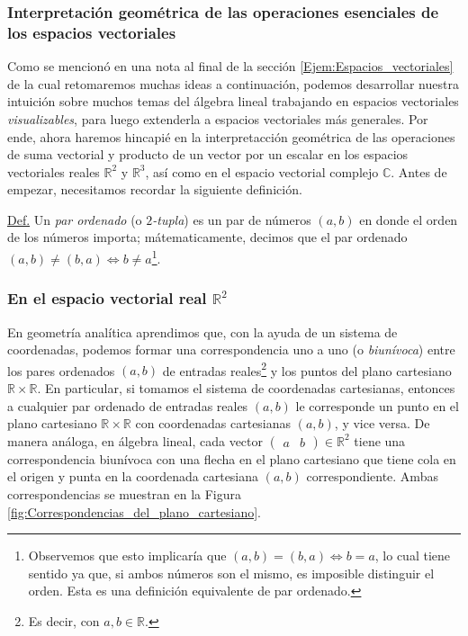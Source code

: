 \documentclass[apuntes]{subfiles}
\begin{document}
\newpage
\subsubsection{Interpretación geométrica de las operaciones esenciales de los espacios vectoriales} \label{Sssec:Interpretación geométrica de las operaciones de los espacios vectoriales}

Como se mencionó en una nota al final de la sección \ref{Ejem:Espacios_vectoriales} \hspace{1.5mm}\textemdash de la cual retomaremos muchas ideas a continuación\textemdash, podemos desarrollar nuestra intuición sobre muchos temas del álgebra lineal trabajando en espacios vectoriales \emph{visualizables}, para luego extenderla a espacios vectoriales más generales. Por ende, ahora haremos hincapié en la interpretacción geométrica de las operaciones de suma vectorial y producto de un vector por un escalar en los espacios vectoriales reales $\mathbb{R}^2$ y $\mathbb{R}^3$, así como en el espacio vectorial complejo $\mathbb{C}$. Antes de empezar, necesitamos recordar la siguiente definición.

\vspace{1.5mm}

\begin{tcolorbox}
 \underline{Def.} Un \emph{par ordenado} (o \emph{$2$-tupla}) es un par de números $(a,b)$ en donde el orden de los números importa; mátematicamente, decimos que el par ordenado $(a,b)\neq (b,a)\iff b\neq a$\footnote{Observemos que esto implicaría que $(a,b)=(b,a)\iff b=a$, lo cual tiene sentido ya que, si ambos números son el mismo, es imposible distinguir el orden. Esta es una definición equivalente de par ordenado.}.
\end{tcolorbox}{}

\subsubsection{En el espacio vectorial real \texorpdfstring{$\mathbb{R}^2$}{TEXT}} \label{Ejem:En_R^2}

En geometría analítica aprendimos que, con la ayuda de un sistema de coordenadas, podemos formar una correspondencia uno a uno (o \emph{biunívoca}) entre los pares ordenados $(a,b)$ de entradas reales\footnote{Es decir, con $a,b\in\mathbb{R}$.} y los puntos del plano cartesiano $\mathbb{R}\times\mathbb{R}$. En particular, si tomamos el sistema de coordenadas cartesianas, entonces a cualquier par ordenado de entradas reales $(a,b)$ le corresponde un punto en el plano cartesiano $\mathbb{R}\times\mathbb{R}$ con coordenadas cartesianas $(a,b)$, y vice versa. De manera análoga, en álgebra lineal, cada vector $\begin{pmatrix}a&b\end{pmatrix} \in \mathbb{R}^2$ tiene una correspondencia biunívoca con una flecha en el plano cartesiano que tiene cola en el origen y punta en la coordenada cartesiana $(a,b)$ correspondiente. Ambas correspondencias se muestran en la Figura \ref{fig:Correspondencias_del_plano_cartesiano}.
\end{document}
